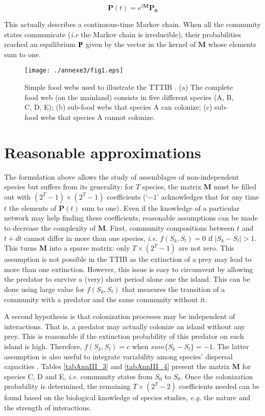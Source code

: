 \begin{equation}
\mathbf{P}(t) = e^{t\mathbf{M}}\mathbf{P_0}
\end{equation}

This actually describes a continuous-time Markov chain. When all the
community states communicate (\emph{i.e} the Markov chain is
irreducible), their probabilities reached an equilibrium
\(\mathbf{P}^{\*}\) given by the vector in the kernel of \(\mathbf{M}\)
whose elements sum to one.

\begin{figure}[h!]
\centering
\texttt{[image: ./annexe3/fig1.eps]}
\caption[Simple food webs illustrting the TTTIB]{Simple food webs used to illustrate the TTTIB \cite{Gravel2011}.
 (a) The complete food web (on the mainland) consists in five different species (A, B, C, D, E);
 (b) sub-food webs that species A can colonize; (c) sub-food webs that species A cannot colonize.
}
\label{ann3fig1}
\end{figure}

\section{Reasonable approximations}\label{reasonable-approximations}

The formulation above allows the study of assemblages of non-independent species
but suffers from its generality: for \(T\) species, the
matrix \(\mathbf{M}\) must be filled out with \((2^T-1) \times (2^T-1)\)
coefficients (`\(-1\)' acknowledges that for any time \(t\) the elements
of \(\mathbf{P}(t)\) sum to one). Even if the knowledge of a particular
network may help finding these coefficients, reasonable assumptions can
be made to decrease the complexity of \(\mathbf{M}\). First, community
compositions between \(t\) and \(t+dt\) cannot differ in more than one
species, \emph{i.e.} \(f(S_k,S_l)=0\) if \(|S_k-S_l|>1\). This turns
\(\mathbf{M}\) into a sparse matrix: only \(T \times (2^T-1)\) are not
zero. This assumption is not possible in the TTIB as the extinction of a
prey may lead to more than one extinction. However, this issue is easy
to circumvent by allowing the predator to survive a (very) short period
alone one the island. This can be done using large value for
\(f(S_k,S_l)\) that measures the transition of a community with a
predator and the same community without it.

A second hypothesis is that colonization processes may be independent of
interactions. That is, a predator may actually colonize an island
without any prey. This is reasonable if the extinction probability of
this predator on such island is high. Therefore, \(f(S_k,S_l)=c\)
when \(sum\{S_k-S_l\}=-1\). The latter assumption is also useful to
integrate variability among species' dispersal capacities \citep{Cazelles2015}.
Tables \ref{tabAnnIII_3} and \ref{tabAnnIII_4} present the matrix
\(\mathbf{M}\) for species C, D and E, \emph{i.e.} community
states from \(S_0\) to \(S_8\). Once the colonization probability is
determined, the remaining \(T \times (2^T-2)\) coefficients needed can
be found based on the biological knowledge of species studies,
\emph{e.g.} the nature and the strength of interactions.



